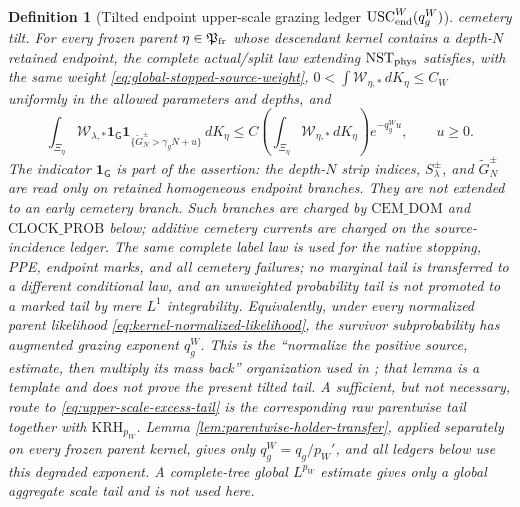 \documentclass[11pt]{article}
\newtheorem{definition}[theorem]{Definition}
\newcommand{\one}{\mathbf 1}
\begin{document}
\begin{definition}[Tilted endpoint upper-scale grazing ledger
$\mathrm{USC}_{\rm end}^{W}(q_g^W)$]
cemetery tilt.
For every frozen parent $\eta\in\mathfrak P_{\rm fr}$ whose descendant
kernel contains a depth-$N$ retained endpoint, the complete actual/split law
extending $\mathrm{NST}_{\rm phys}$ satisfies, with the \emph{same} weight
\eqref{eq:global-stopped-source-weight},
$0<\int\mathscr W_{\eta,*}\,dK_\eta\le C_W$ uniformly in the allowed
parameters and depths, and
\begin{equation}
\label{eq:upper-scale-excess-tail}
 \int_{\Xi_\eta}
  \mathscr W_{\lambda,*}\one_{\mathsf G}
  \one_{\{\widetilde G_N^\pm>\gamma_gN+u\}}\,dK_\eta
 \le C\!\left(\int_{\Xi_\eta}\mathscr W_{\eta,*}\,dK_\eta\right)
 e^{-q_g^Wu},\qquad u\ge0.
\end{equation}
The indicator $\one_{\mathsf G}$ is part of the assertion: the depth-$N$
strip indices, $S_\lambda^\pm$, and $\widetilde G_N^\pm$ are read only on
retained homogeneous endpoint branches.  They are not extended to an early
cemetery branch.  Such branches are charged by $\mathrm{CEM\_DOM}$ and
$\mathrm{CLOCK\_PROB}$ below; additive cemetery currents are charged on the
source-incidence ledger.  The same complete label law is used for the
native stopping, PPE, endpoint marks, and all cemetery failures;
no marginal tail is transferred to a different conditional law, and an
unweighted probability tail is not promoted to a marked tail by mere
$L^1$ integrability.  Equivalently, under every normalized parent likelihood
\eqref{eq:kernel-normalized-likelihood}, the survivor subprobability has
augmented grazing exponent $q_g^W$.  This is the ``normalize the
positive source, estimate,
then multiply its mass back'' organization used in
\cite[Lemma~5.10]{CanestrariHoles}; that lemma is a template and does not
prove the present tilted tail.  A sufficient, but not necessary, route to
\eqref{eq:upper-scale-excess-tail} is the corresponding raw parentwise tail
together with $\mathrm{KRH}_{p_W}$.  Lemma
\ref{lem:parentwise-holder-transfer}, applied separately on every frozen
parent kernel, gives only $q_g^W=q_g/p_W'$, and all ledgers below use this
degraded exponent.  A complete-tree global $L^{p_W}$ estimate gives only a
global aggregate scale tail and is not used here.
\end{definition}
\end{document}

